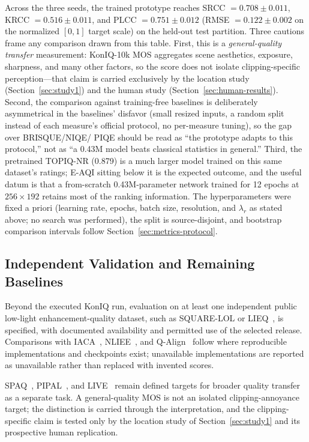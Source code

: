 \documentclass[5p,times,twocolumn]{elsarticle}
\begin{document}
Across the three seeds, the trained prototype reaches
SRCC $= 0.708 \pm 0.011$, KRCC $= 0.516 \pm 0.011$, and
PLCC $= 0.751 \pm 0.012$ (RMSE $= 0.122 \pm 0.002$ on the normalized
$[0,1]$ target scale) on the held-out test partition. Three cautions frame
any comparison drawn from this table. First, this is a \emph{general-quality
transfer} measurement: KonIQ-10k MOS aggregates scene aesthetics, exposure,
sharpness, and many other factors, so the score does not isolate
clipping-specific perception---that claim is carried exclusively by the
location study (Section~\ref{sec:study1}) and the human study
(Section~\ref{sec:human-results}). Second, the comparison against
training-free baselines is deliberately asymmetrical in the baselines'
disfavor (small resized inputs, a random split instead of each measure's
official protocol, no per-measure tuning), so the gap over BRISQUE/NIQE/
PIQE should be read as ``the prototype adapts to this protocol,'' not as
``a 0.43M model beats classical statistics in general.'' Third, the
pretrained TOPIQ-NR (0.879) is a much larger model trained on this same
dataset's ratings; E-AQI sitting below it is the expected outcome, and the
useful datum is that a from-scratch 0.43M-parameter network trained for 12
epochs at $256 \times 192$ retains most of the ranking information.
The hyperparameters were fixed a priori (learning rate, epochs, batch size,
resolution, and $\lambda_r$ as stated above; no search was performed), the
split is source-disjoint, and bootstrap comparison intervals follow
Section~\ref{sec:metrics-protocol}.

\subsection{Independent Validation and Remaining Baselines}
\label{sec:baselines}

Beyond the executed KonIQ run, evaluation on at least one independent public
low-light enhancement-quality dataset, such as SQUARE-LOL or
LIEQ~\cite{zhai2021lieq}, is specified, with documented availability and
permitted use of the selected release. Comparisons with
IACA~\cite{chen2024gapclosing}, NLIEE~\cite{zhang2021nliee}, and
Q-Align~\cite{wu2023qalign} follow where reproducible implementations and
checkpoints exist; unavailable implementations are reported as unavailable
rather than replaced with invented scores.

SPAQ~\cite{fang2020spaq}, PIPAL~\cite{gu2020pipal}, and
LIVE~\cite{sheikh2006live} remain defined targets for broader quality
transfer as a separate task. A general-quality MOS is not an isolated
clipping-annoyance target; the distinction is carried through the
interpretation, and the clipping-specific claim is tested only by the
location study of Section~\ref{sec:study1} and its prospective human
replication.
\end{document}
